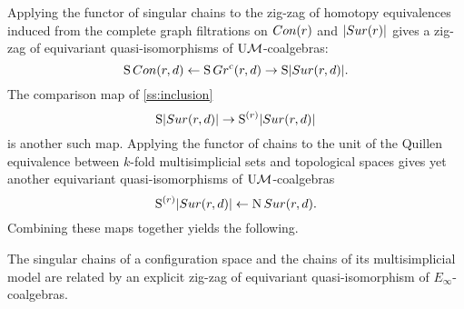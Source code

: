 %



Applying the functor of singular chains to the zig-zag of homotopy equivalences induced from the complete graph filtrations on $Con(r)$ and $\lvert Sur(r)\rvert$ gives a zig-zag of equivariant quasi-isomorphisms of $\mathrm{U}\mathcal{M}$-coalgebras:
\[
\operatorname{S}Con(r,d) \leftarrow \operatorname{S} Gr^{\mathrm{c}}(r,d) \to \operatorname{S}\lvert Sur(r,d)\rvert.
\]
The comparison map of \cref{ss:inclusion}
\[
\operatorname{S}\lvert Sur(r,d)\rvert \to \operatorname{S}^{(r)}\lvert Sur(r,d)\rvert
\]
is another such map.
Applying the functor of chains to the unit of the Quillen equivalence between $k$-fold multisimplicial sets and topological spaces gives yet another equivariant quasi-isomorphisms of $\mathrm{U}\mathcal{M}$-coalgebras
\[
\operatorname{S}^{(r)}\lvert Sur(r,d)\rvert \leftarrow \operatorname{N}Sur(r,d).
\]
Combining these maps together yields the following.
\begin{theorem*}
	The singular chains of a configuration space and the chains of its multisimplicial model are related by an explicit zig-zag of equivariant quasi-isomorphism of $E_\infty$-coalgebras.
\end{theorem*}

